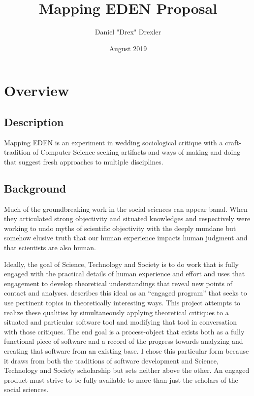 \documentclass[a4paper,man,natbib]{apa6}
\title{Mapping EDEN Proposal}
\author{Daniel "Drex" Drexler}
\affiliation{Center for Science, Technology and Society at Drexel University}
\date{August 2019}
\begin{document}
   \maketitle

   \section*{Overview}
   \subsection*{Description}
   Mapping EDEN is an experiment in wedding sociological critique with a craft-tradition of Computer Science seeking artifacts and ways of making and doing that suggest fresh approaches to multiple disciplines.
   \subsection*{Background}
   Much of the groundbreaking work in the social sciences can appear banal. When they articulated strong objectivity and situated knowledges \citet{Harding1992-od} and \citet{Haraway1993-kw} respectively were working to undo myths of scientific objectivity with the deeply mundane but somehow elusive truth that our human experience impacts human judgment and that scientists are also human.

   Ideally, the goal of Science, Technology and Society is to do work that is fully engaged with the practical details of human experience and effort and uses that engagement to develop theoretical understandings that reveal new points of contact and analyses. \citet{Sismondo2008-xz} describes this ideal as an “engaged program” that seeks to use pertinent topics in theoretically interesting ways. This project attempts to realize these qualities by simultaneously applying theoretical critiques to a situated and particular software tool and modifying that tool in conversation with those critiques. The end goal is a process-object that exists both as a fully functional piece of software and a record of the progress towards analyzing and creating that software from an existing base. I chose this particular form because it draws from both the traditions of software development and Science, Technology and Society scholarship but sets neither above the other. An engaged product must strive to be fully available to more than just the scholars of the social sciences.
\end{document}
